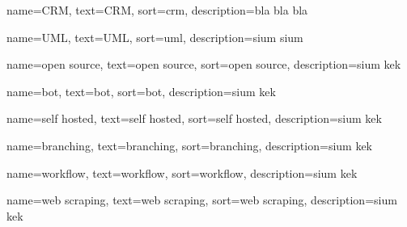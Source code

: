 

%

 {
    name=CRM,
    text=CRM,
    sort=crm,
    description={bla bla bla}
}

 {
    name=UML,
    text=UML,
    sort=uml,
    description={sium sium}
}

 {
    name=open source,
    text=open source,
    sort=open source,
    description={sium kek}
}

 {
    name=bot,
    text=bot,
    sort=bot,
    description={sium kek}
}

 {
    name=self hosted,
    text=self hosted,
    sort=self hosted,
    description={sium kek}
}

 {
    name=branching,
    text=branching,
    sort=branching,
    description={sium kek}
}

 {
    name=workflow,
    text=workflow,
    sort=workflow,
    description={sium kek}
}

 {
    name=web scraping,
    text=web scraping,
    sort=web scraping,
    description={sium kek}
}

